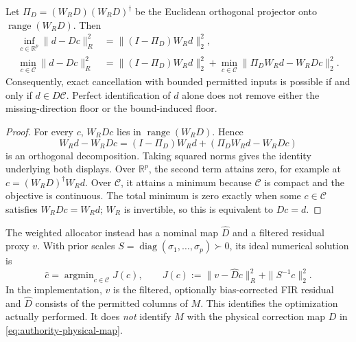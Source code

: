 \begin{proposition}
\label{prop:authority-floor}
Let $\Pi_D=(W_R D)(W_R D)^\dagger$ be the Euclidean orthogonal projector onto
$\operatorname{range}(W_R D)$. Then
\begin{align}
 \inf_{c\in\mathbb R^p}\|d-Dc\|_R^2
   &=\|(I-\Pi_D)W_R d\|_2^2, \label{eq:authority-projection-floor}\\
 \min_{c\in\mathcal C}\|d-Dc\|_R^2
   &=\|(I-\Pi_D)W_R d\|_2^2
     +\min_{c\in\mathcal C}\|\Pi_D W_R d-W_R Dc\|_2^2.
     \label{eq:authority-box-floor}
\end{align}
Consequently, exact cancellation with bounded permitted inputs is possible
if and only if $d\in D\mathcal C$. Perfect identification of $d$ alone does
not remove either the missing-direction floor or the bound-induced floor.
\end{proposition}

\begin{proof}
For every $c$, $W_R Dc$ lies in $\operatorname{range}(W_R D)$. Hence
\[
 W_R d-W_R Dc=(I-\Pi_D)W_R d+(\Pi_D W_R d-W_R Dc)
\]
is an orthogonal decomposition. Taking squared norms gives the identity
underlying both displays. Over $\mathbb R^p$, the second term attains zero,
for example at $c=(W_R D)^\dagger W_R d$. Over $\mathcal C$, it attains a minimum
because $\mathcal C$ is compact and the objective is continuous. The total
minimum is zero exactly when some $c\in\mathcal C$ satisfies $W_R Dc=W_R d$;
$W_R$ is invertible, so this is equivalent to $Dc=d$.
\end{proof}

The weighted allocator instead has a nominal map $\widehat D$ and a filtered
residual proxy $v$. With prior scales
$S=\operatorname{diag}(\sigma_1,\ldots,\sigma_p)\succ0$, its ideal numerical
solution is
\begin{equation}
 \widehat c=\mathop{\arg\min}_{c\in\mathcal C}J(c),\qquad
 J(c):=\|v-\widehat D c\|_R^2+\|S^{-1}c\|_2^2.
 \label{eq:authority-ridge}
\end{equation}
In the implementation, $v$ is the filtered, optionally bias-corrected FIR
residual and $\widehat D$ consists of the permitted columns of $M$. This
identifies the optimization actually performed. It does \emph{not} identify
$M$ with the physical correction map $D$ in
\eqref{eq:authority-physical-map}.

